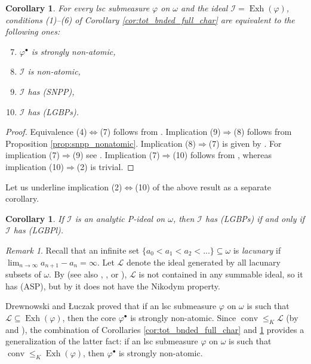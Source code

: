 \documentclass[a4paper,11pt,fleqn]{amsart}
\newtheorem{corollary}[theorem]{Corollary}
\theoremstyle{definition}
\theoremstyle{remark}
\newtheorem{remark}[theorem]{Remark}
\numberwithin{equation}{section}
\newcommand{\iI}{\mathcal{I}}
\newcommand{\lL}{\mathcal{L}}
\DeclareMathOperator{\conv}{{conv}}
\DeclareMathOperator{\exh}{Exh}
\newcommand{\sub}{\subseteq}
\begin{document}
\begin{corollary}\label{cor:tot_bnded_full_char2}
For every lsc submeasure $\varphi$ on $\omega$ and the ideal $\iI=\exh(\varphi)$, conditions (1)--(6) of Corollary \ref{cor:tot_bnded_full_char} are equivalent to the following ones:
\begin{enumerate}
\setcounter{enumi}{6}
    \item $\varphi^\bullet$ is strongly non-atomic,
    \item $\iI$ is non-atomic,
    \item $\iI$ has (SNPP),
    \item $\iI$ has (LGBPs).
\end{enumerate}
\end{corollary}
\begin{proof}
Equivalence (4)$\Leftrightarrow$(7) follows from \cite[Theorem 3.6]{FMRS07}. Implication (9)$\Rightarrow$(8) follows from Proposition \ref{prop:snpp_nonatomic}. Implication (8)$\Rightarrow$(7) is given by \cite[Corollary 3.2]{DL08ii}. For implication (7)$\Rightarrow$(9) see \cite[proof of Proposition 3]{Stu07}. Implication (7)$\Rightarrow$(10) follows from \cite[Proposition 4.1]{DFP96}, whereas implication (10)$\Rightarrow$(2) is trivial.
\end{proof}

Let us underline implication (2)$\Leftrightarrow$(10) of the above result as a separate corollary.

\begin{corollary}\label{cor:p_anal_lgbps_lgbpl}
    If $\iI$ is an analytic P-ideal on $\omega$, then $\iI$ has (LGBPs) if and only if $\iI$ has (LGBPl).
\end{corollary}

\begin{remark}\label{rem:lacunary}
Recall that an infinite set $\{a_0<a_1<a_2<...\}\sub\omega$ is \textit{lacunary} if $\lim_{n\to\infty}a_{n+1}-a_n=\infty$. Let $\lL$ denote the ideal generated by all lacunary subsets of $\omega$. By \cite[Proposition 2]{SF81} (see also \cite{Agn47}, \cite{Aue30}, or \cite{KN17}), $\lL$ is not contained in any summable ideal, so it has (ASP), but by \cite[Example 4.2]{DP00} it does not have the Nikodym property.

Drewnowski and \L uczak \cite[Theorem 4.1]{DL08ii} proved that if an lsc submeasure $\varphi$ on $\omega$ is such that $\lL\sub\exh(\varphi)$, then the core $\varphi^\bullet$ is strongly non-atomic. Since $\conv\le_K\lL$ (by \cite[Lemma 3.2]{KN17} and \cite[page 57]{MA09}), the combination of Corollaries \ref{cor:tot_bnded_full_char} and \ref{cor:tot_bnded_full_char2} provides a generalization of the latter fact: if an lsc submeasure $\varphi$ on $\omega$ is such that $\conv\le_K\exh(\varphi)$, then $\varphi^\bullet$ is strongly non-atomic.
\end{remark}
\end{document}
